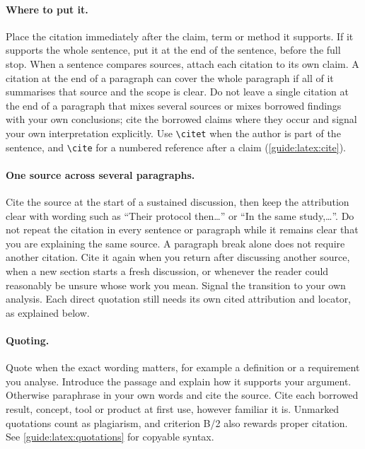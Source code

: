 \paragraph{Where to put it.} Place the citation immediately after the claim, term or method it supports. If it supports the whole sentence, put it at the end of the sentence, before the full stop. When a sentence compares sources, attach each citation to its own claim. A citation at the end of a paragraph can cover the whole paragraph if all of it summarises that source and the scope is clear. Do not leave a single citation at the end of a paragraph that mixes several sources or mixes borrowed findings with your own conclusions; cite the borrowed claims where they occur and signal your own interpretation explicitly. Use \texttt{\textbackslash citet} when the author is part of the sentence, and \texttt{\textbackslash cite} for a numbered reference after a claim (\cref{guide:latex:cite}).

\paragraph{One source across several paragraphs.} Cite the source at the start of a sustained discussion, then keep the attribution clear with wording such as \enquote{Their protocol then\ldots} or \enquote{In the same study,\ldots}. Do not repeat the citation in every sentence or paragraph while it remains clear that you are explaining the same source. A paragraph break alone does not require another citation. Cite it again when you return after discussing another source, when a new section starts a fresh discussion, or whenever the reader could reasonably be unsure whose work you mean. Signal the transition to your own analysis. Each direct quotation still needs its own cited attribution and locator, as explained below.

\paragraph{Quoting.} Quote when the exact wording matters, for example a definition or a requirement you analyse. Introduce the passage and explain how it supports your argument. Otherwise paraphrase in your own words and cite the source. Cite each borrowed result, concept, tool or product at first use, however familiar it is. Unmarked quotations count as plagiarism, and criterion B/2 also rewards proper citation. See \cref{guide:latex:quotations} for copyable syntax.

